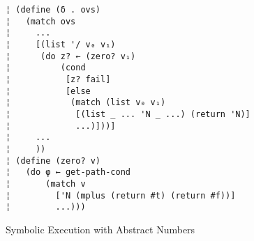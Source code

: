 \begin{figure}
\begin{lstlisting}
¦ (define (δ . ovs)
¦   (match ovs
¦     ...
¦     [(list '/ v₀ v₁)
¦      (do z? ← (zero? v₁)
¦          (cond
¦           [z? fail]
¦           [else
¦            (match (list v₀ v₁)
¦             [(list _ ... 'N _ ...) (return 'N)]
¦             ...)]))]
¦     ...
¦     ))
¦ (define (zero? v)
¦   (do φ ← get-path-cond
¦       (match v
¦         ['N (mplus (return #t) (return #f))]
¦         ...)))
\end{lstlisting}
\caption{Symbolic Execution with Abstract Numbers}
\label{f:symbolic-widen}
\end{figure}
